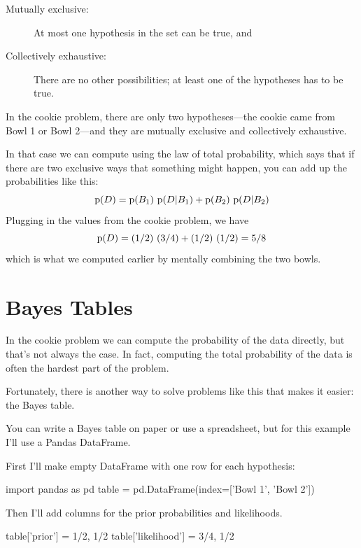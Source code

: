 \documentclass[12pt]{book}
\theoremstyle{exercise}
\begin{document}

\begin{description}

\item[Mutually exclusive:] At most one hypothesis in
the set can be true, and

\item[Collectively exhaustive:] There are no other
possibilities; at least one of the hypotheses has to be true.

\end{description}

In the cookie problem, there are only two hypotheses---the cookie
came from Bowl 1 or Bowl 2---and they are mutually exclusive and
collectively exhaustive.


In that case we can compute  using the law of total probability,
which says that if there are two exclusive ways that something
might happen, you can add up the probabilities like this:
%
\[ \mathrm{p}(D) = \mathrm{p}(B_1)~\mathrm{p}(D|B_1) + \mathrm{p}(B_2)~\mathrm{p}(D|B_2) \]
%
Plugging in the values from the cookie problem, we have
%
\[ \mathrm{p}(D) = (1/2)~(3/4) + (1/2)~(1/2) = 5/8 \]
%
which is what we computed earlier by mentally combining the two
bowls.


\section{Bayes Tables}

In the cookie problem we can compute the probability of the data directly, but that's not always the case.  In fact, computing the total probability of the data is often the hardest part of the problem.

Fortunately, there is another way to solve problems like this that makes it easier: the Bayes table.

You can write a Bayes table on paper or use a spreadsheet, but for this example I'll use a Pandas DataFrame.

First I'll make empty DataFrame with one row for each hypothesis:

\begin{code}
import pandas as pd
table = pd.DataFrame(index=['Bowl 1', 'Bowl 2'])
\end{code}

Then I'll add columns for the prior probabilities and likelihoods.

\begin{code}
table['prior'] = 1/2, 1/2
table['likelihood'] = 3/4, 1/2
\end{code}
\end{document}
